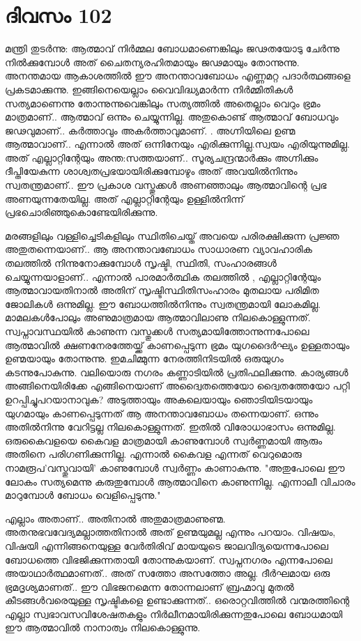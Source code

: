  
\section{ദിവസം 102}


മന്ത്രി തുടര്‍ന്നു: ആത്മാവ്‌ നിര്‍മ്മല ബോധമാണെങ്കിലും ജഢതയോടു ചേര്‍ന്നു നില്‍ക്കുമ്പോള്‍ അത്‌ ചൈതന്യരഹിതമായും ജഢമായും തോന്നുന്നു. അനന്തമായ ആകാശത്തില്‍ ഈ അനന്താവബോധം എണ്ണമറ്റ പദാര്‍ത്ഥങ്ങളെ പ്രകടമാക്കുന്നു. ഇങ്ങിനെയെല്ലാം വൈവിദ്ധ്യമാര്‍ന്ന നിര്‍മ്മിതികള്‍ സത്യമാണെന്നു തോന്നുന്നുവെങ്കിലും സത്യത്തില്‍ അതെല്ലാം വെറും ഭ്രമം മാത്രമാണ്‌.. ആത്മാവ്‌ ഒന്നും ചെയ്യുന്നില്ല. അതുകൊണ്ട്‌ ആത്മാവ്‌ ബോധവും ജഢവുമാണ്‌..  കര്‍ത്താവും അകര്‍ത്താവുമാണ്‌. .  അഗ്നിയിലെ ഉണ്മ ആത്മാവാണ്‌..  എന്നാല്‍ അത്‌ ഒന്നിനേയും എരിക്കുന്നില്ല.സ്വയം എരിയുന്നുമില്ല. അത്‌ എല്ലാറ്റിന്റേയും അന്ത:സത്തയാണ്‌..  സൂര്യചന്ദ്രന്മാര്‍ക്കും അഗ്നിക്കും ദീപ്തിയേകുന്ന ശാശ്വതപ്രഭയായിരിക്കുമ്പോഴും അത്‌ അവയില്‍നിന്നും സ്വതന്ത്രമാണ്‌..  ഈ പ്രകാശ വസ്തുക്കള്‍ അണഞ്ഞാലും ആത്മാവിന്റെ പ്രഭ അണയുന്നതേയില്ല. അത്‌ എല്ലാറ്റിന്റേയും ഉള്ളില്‍നിന്ന് പ്രഭചൊരിഞ്ഞുകൊണ്ടേയിരിക്കുന്നു.

മരങ്ങളിലും വള്ളിച്ചെടികളിലും സ്ഥിതിചെയ്ത്‌ അവയെ പരിരക്ഷിക്കുന്ന പ്രജ്ഞ അതുതന്നെയാണ്‌..  ആ അനന്താവബോധം സാധാരണ വ്യാവഹാരിക തലത്തില്‍ നിന്നുനോക്കുമ്പോള്‍ സൃഷ്ടി, സ്ഥിതി, സംഹാരങ്ങള്‍ ചെയ്യുന്നയാളാണ്‌..  എന്നാല്‍ പാരമാര്‍ത്ഥിക തലത്തില്‍ , എല്ലാറ്റിന്റേയും ആത്മാവായതിനാല്‍ അതിന്‌ സൃഷ്ടിസ്ഥിതിസംഹാരം മുതലായ പരിമിത ജോലികള്‍ ഒന്നുമില്ല. ഈ ബോധത്തില്‍നിന്നും സ്വതന്ത്രമായി ലോകമില്ല. മാമലകള്‍പോലും അണുമാത്രമായ ആത്മാവിലാണു നിലകൊള്ളുന്നത്‌. സ്വപ്നാവസ്ഥയില്‍ കാണുന്ന വസ്തുക്കള്‍ സത്യമായിത്തോന്നുന്നപോലെ ആത്മാവില്‍ ക്ഷണനേരത്തേയ്ക്ക്‌ കാണപ്പെടുന്ന ഭ്രമം യുഗദൈര്‍ഘ്യം ഉള്ളതായും ഉണ്മയായും തോന്നുന്നു. ഇമചിമ്മുന്ന നേരത്തിനിടയില്‍ ഒരുയുഗം കടന്നുപോകുന്നു. വലിയൊരു നഗരം കണ്ണാടിയില്‍ പ്രതിഫലിക്കുന്നു. കാര്യങ്ങള്‍ അങ്ങിനെയിരിക്കേ എങ്ങിനെയാണ്‌ അദ്വൈതത്തെയോ ദ്വൈതത്തേയോ പറ്റി ഉറപ്പിച്ചുപറയാനാവുക? അടുത്തായും അകലെയായും ഞൊടിയിടയായും യുഗമായും കാണപ്പെടുന്നത്‌ ആ അനന്താവബോധം തന്നെയാണ്‌. ഒന്നും അതില്‍നിന്നു വേറിട്ടല്ല നിലകൊള്ളുന്നത്‌. ഇതില്‍ വിരോധാഭാസം ഒന്നുമില്ല. ഒരുകൈവളയെ കൈവള മാത്രമായി കാണുമ്പോള്‍ സ്വര്‍ണ്ണമായി ആരും അതിനെ  പരിഗണിക്കുന്നില്ല. എന്നാല്‍ കൈവള എന്നത്‌ വെറുമൊരു നാമരൂപ'വസ്തുവായി' കാണുമ്പോള്‍ സ്വര്‍ണ്ണം കാണാകുന്നു. "അതുപോലെ ഈ ലോകം സത്യമെന്നു കരുതുമ്പോള്‍ ആത്മാവിനെ കാണുന്നില്ല. എന്നാലീ വിചാരം മാറുമ്പോള്‍ ബോധം വെളിപ്പെടുന്നു." 

എല്ലാം അതാണ്‌..  അതിനാല്‍ അതുമാത്രമാണുണ്മ. അതനുഭവവേദ്യമല്ലാത്തതിനാല്‍ അത്  ഉണ്മയുമല്ല എന്നും പറയാം. വിഷയം, വിഷയി എന്നിങ്ങനെയുള്ള വേര്‍തിരിവ്‌ മായയുടെ ജാലവിദ്യയെന്നപോലെ ബോധത്തെ വിഭജിക്കുന്നതായി തോന്നുകയാണ്‌. സ്വപ്നനഗരം എന്നപോലെ അയാഥാര്‍ത്ഥമാണത്‌..  അത്‌ സത്തോ അസത്തോ അല്ല. ദീര്‍ഘമായ ഒരു ഭ്രമദൃശ്യമാണത്‌..  ഈ വിഭജനമെന്ന തോന്നലാണ്‌ ബ്രഹ്മാവു മുതല്‍ കീടങ്ങള്‍വരെയുള്ള സൃഷ്ടികളെ ഉണ്ടാക്കുന്നത്‌..  ഒരൊറ്റവിത്തില്‍ വന്മരത്തിന്റെ എല്ലാ സ്വഭാവസവിശേഷതകളും നിര്‍ലീനമായിരിക്കുന്നതുപോലെ ബോധമായി ഈ ആത്മാവില്‍ നാനാത്വം നിലകൊള്ളുന്നു. 

